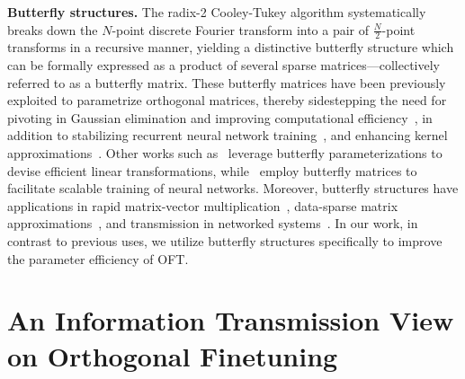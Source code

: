 \textbf{Butterfly structures.} The radix-2 Cooley-Tukey algorithm systematically breaks down the $N$-point discrete Fourier transform into a pair of $\frac{N}{2}$-point transforms in a recursive manner, yielding a distinctive butterfly structure which can be formally expressed as a product of several sparse matrices—collectively referred to as a butterfly matrix. These butterfly matrices have been previously exploited to parametrize orthogonal matrices, thereby sidestepping the need for pivoting in Gaussian elimination and improving computational efficiency~\cite{parker1995random}, in addition to stabilizing recurrent neural network training~\cite{jing2017tunable}, and enhancing kernel approximations~\cite{munkhoeva2018quadrature}. Other works such as~\cite{dao2019learning,dao2019kaleidoscope} leverage butterfly parameterizations to devise efficient linear transformations, while~\cite{chen2022pixelated,dao2022monarch} employ butterfly matrices to facilitate scalable training of neural networks. Moreover, butterfly structures have applications in rapid matrix-vector multiplication~\cite{michielssen1996multilevel,o2010algorithm}, data-sparse matrix approximations~\cite{li2015butterfly}, and transmission in networked systems~\cite{klasing1994broadcasting,li2003linear,rajasingh2016transmission}. In our work, in contrast to previous uses, we utilize butterfly structures specifically to improve the parameter efficiency of OFT.

\section{An Information Transmission View on Orthogonal Finetuning}

